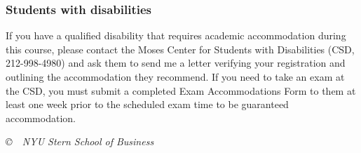 \documentclass[12pt,pdftex,twoside,letterpaper]{exam}
\begin{document}
\subsubsection*{Students with disabilities}

If you have a qualified disability that requires academic accommodation during this course,
please contact the Moses Center for Students with Disabilities (CSD, 212-998-4980) and ask them to
send me a letter verifying your registration and outlining the accommodation they recommend.
If you need to take an exam at the CSD, you must submit a completed Exam Accommodations Form to them
at least one week prior to the scheduled exam time to be guaranteed accommodation.

\vfill \centerline{\it \copyright \ \number\year \
NYU Stern School of Business}
\end{document}
